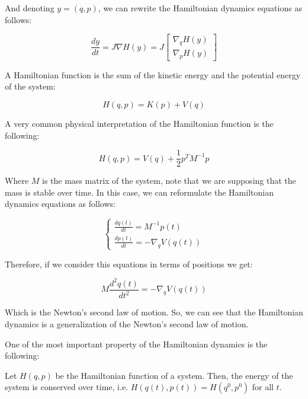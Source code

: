 \documentclass{report}
\begin{document}
And denoting \(y = (q,p)\), we can rewrite the Hamiltonian dynamics equations as follows:

\begin{equation} 
	\frac{dy}{dt} = J \nabla H(y) = J \begin{bmatrix} \nabla_q H(y) \\ \nabla_p H(y) \end{bmatrix}
	\label{eq:hamiltoniandynamics2} 
\end{equation}

A Hamiltonian function is the sum of the kinetic energy and the potential energy of the system:

\begin{equation*}
	H(q,p) = K(p) + V(q)
\end{equation*}

A very common physical interpretation of the Hamiltonian function is the following:

\begin{equation*}
	H(q,p) = V(q) + \frac{1}{2} p^T M^{-1} p
\end{equation*}

Where \(M\) is the mass matrix of the system, note that we are supposing that the mass is stable over time. In this case, we can reformulate the Hamiltonian dynamics equations as follows:

\begin{equation} 
	\begin{cases}
		\frac{dq(t)}{dt} = M^{-1} p(t) \\
		\frac{dp(t)}{dt} = -\nabla_q V(q(t))
	\end{cases}
	\label{eq:hamiltoniandynamics3}
\end{equation}

Therefore, if we consider this equations in terms of positions we get:

\begin{equation*} 
	M\frac{d^2q(t)}{dt^2} = -\nabla_q V(q(t))
\end{equation*}

Which is the Newton's second law of motion. So, we can see that the Hamiltonian dynamics is a generalization of the Newton's second law of motion.

One of the most important property of the Hamiltonian dynamics is the following:

\begin{theorem}
	Let \(H(q,p)\) be the Hamiltonian function of a system. Then, the energy of the system is conserved over time, i.e. \(H(q(t),p(t)) = H(q^0,p^0)\) for all \(t\).
\end{theorem}
\end{document}
